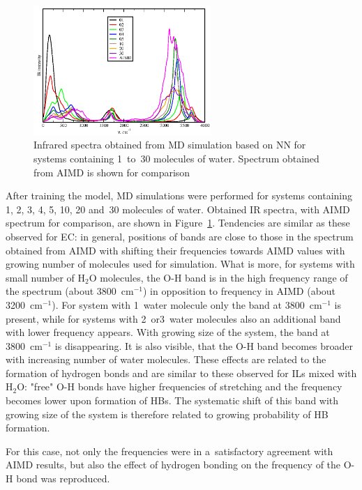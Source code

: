 \begin{figure}[ht]
    \centering
    \includegraphics[width=0.6\textwidth]{img/5-alternatives-to-aimd/3-ml/h2o.png}
    \caption{Infrared spectra obtained from MD simulation based on NN for systems containing 1~to~30 molecules of water. Spectrum obtained from AIMD is shown for comparison}
    \label{fig:ml-h2o}
\end{figure}

After training the model, MD simulations were performed for systems containing 1, 2, 3, 4, 5, 10, 20 and~30 molecules of water. Obtained IR spectra, with AIMD spectrum for comparison, are shown in Figure~\ref{fig:ml-h2o}. Tendencies are similar as these observed for EC: in general, positions of bands are close to those in the spectrum obtained from AIMD with shifting their frequencies towards AIMD values with growing number of molecules used for simulation. What is more, for systems with small number of H$_2$O molecules, the O-H band is in the high frequency range of the spectrum (about 3800~cm$^{-1}$) in opposition to frequency in AIMD (about 3200~cm$^{-1}$). For system with 1~water molecule only the band at 3800~cm$^{-1}$ is present, while for systems with 2~or3~water molecules also an additional band with lower frequency appears. With growing size of the system, the band at 3800~cm$^{-1}$ is disappearing. It is also visible, that the O-H band becomes broader with increasing number of water molecules. These effects are related to the formation of hydrogen bonds and are similar to these observed for ILs mixed with H$_2$O: "free" O-H bonds have higher frequencies of stretching and the frequency becomes lower upon formation of HBs. The systematic shift of this band with growing size of the system is therefore related to growing probability of HB formation.

For this case, not only the frequencies were in a~satisfactory agreement with AIMD results, but also the effect of hydrogen bonding on the frequency of the O-H bond was reproduced.

